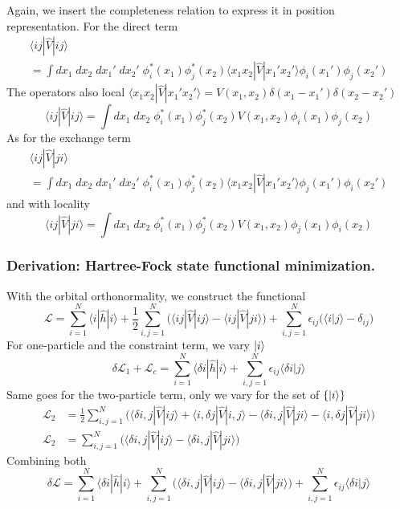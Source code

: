 \documentclass[../../../main.tex]{subfiles}
\begin{document}
Again, we insert the completeness relation to express it in position representation.
For the direct term
\begin{multline*}
  \langle ij|\hat{V}|ij \rangle  \\
  = \int dx_1\;dx_2\;dx_1'\;dx_2'\; \phi_i^*(x_1)\phi_j^*(x_2)\langle x_1 x_2|\hat{V}|x_1' x_2'\rangle \phi_i(x_1')\phi_j(x_2')
\end{multline*}
The operators also local $\langle x_1 x_2|\hat{V} |x_1' x_2'\rangle = V(x_1,x_2)\delta(x_1-x_1')\delta(x_2-x_2')$
\begin{equation*}
  \langle ij|\hat{V}|ij \rangle
  = \int dx_1\;dx_2\; \phi_i^*(x_1)\phi_j^*(x_2) V(x_1,x_2) \phi_i(x_1)\phi_j(x_2)
\end{equation*}
As for the exchange term
\begin{multline*}
  \langle ij|\hat{V}|ji \rangle  \\
  = \int dx_1\;dx_2\;dx_1'\;dx_2'\; \phi_i^*(x_1)\phi_j^*(x_2)\langle x_1 x_2|\hat{V}|x_1' x_2'\rangle \phi_j(x_1')\phi_i(x_2')
\end{multline*}
and with locality
\begin{equation*}
  \langle ij|\hat{V}|ji \rangle
  = \int dx_1\;dx_2\; \phi_i^*(x_1)\phi_j^*(x_2) V(x_1,x_2) \phi_j(x_1)\phi_i(x_2)
\end{equation*}

\subsubsection{Derivation: Hartree-Fock state functional minimization.}
With the orbital orthonormality, we construct the functional
\begin{equation*}
  \mathcal{L}
  = \sum_{i=1}^{N}\langle i|\hat{h}|i\rangle
  + \frac{1}{2}\sum_{i,j=1}^{N}\big(\langle ij|\hat{V}|ij\rangle-\langle ij|\hat{V}|ji\rangle\big)
  + \sum_{i,j=1}^{N}\epsilon_{ij}\big(\langle i| j\rangle-\delta_{ij}\big)
\end{equation*}
For one-particle and the constraint term, we vary $\ket{i}$
\begin{equation*}
  \delta \mathcal{L }_1+\mathcal{L }_c
  = \sum_{i=1}^{N}\langle\delta i|\hat{h}|i\rangle + \sum_{i,j=1}^{N}\epsilon_{ij}\langle \delta i| j\rangle
\end{equation*}
Same goes for the two-particle term, only we vary for the set of $\left\{ \ket{i} \right\} $
\begin{align*}
  \mathcal{L }_2
   & =  \frac{1}{2}\sum_{i,j=1}^{N}\big(\langle\delta i,j|\hat{V}|ij\rangle +\langle i,\delta j|\hat{V}| i, j\rangle-\langle\delta i,j|\hat{V}|ji\rangle - \langle i, \delta j|\hat{V}|ji\rangle\big) \\
  \mathcal{L }_2
   & = \sum_{i,j=1}^{N}\big(\langle\delta i,j|\hat{V}|ij\rangle -\langle\delta i,j|\hat{V}|ji\rangle \big)
\end{align*}
Combining both
\begin{equation*}
  \delta\mathcal{L }
  = \sum_{i=1}^{N}\langle\delta i|\hat{h}|i\rangle + \sum_{i,j=1}^{N}\big(\langle \delta i,j|\hat{V}|ij\rangle -\langle\delta i,j|\hat{V}|ji\rangle \big)+ \sum_{i,j=1}^{N}\epsilon_{ij}\langle \delta i| j\rangle
\end{equation*}
\end{document}
